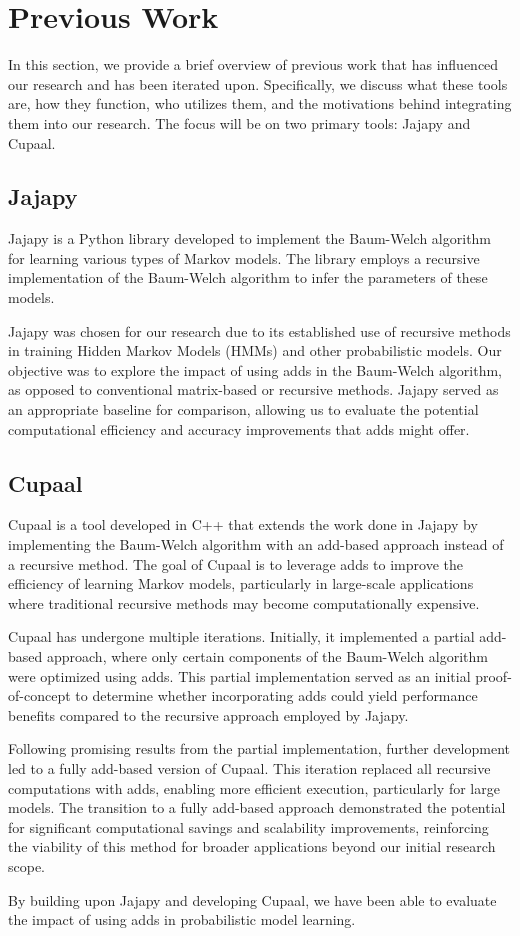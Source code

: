 \section{Previous Work}\label{sec:jajapy_and_cupaal}
In this section, we provide a brief overview of previous work that has influenced our research and has been iterated upon.
Specifically, we discuss what these tools are, how they function, who utilizes them, and the motivations behind integrating them into our research.
The focus will be on two primary tools: Jajapy and Cupaal.


\subsection{Jajapy}\label{subsec:jajapy}
Jajapy is a Python library developed to implement the Baum-Welch algorithm for learning various types of Markov models.
The library employs a recursive implementation of the Baum-Welch algorithm to infer the parameters of these models.

Jajapy was chosen for our research due to its established use of recursive methods in training Hidden Markov Models (HMMs) and other probabilistic models.
Our objective was to explore the impact of using \glspl{add} in the Baum-Welch algorithm, as opposed to conventional matrix-based or recursive methods.
Jajapy served as an appropriate baseline for comparison, allowing us to evaluate the potential computational efficiency and accuracy improvements that \glspl{add} might offer.


\subsection{Cupaal}\label{subsec:cupaal}
Cupaal is a tool developed in C++ that extends the work done in Jajapy by implementing the Baum-Welch algorithm with an \gls{add}-based approach instead of a recursive method.
The goal of Cupaal is to leverage \glspl{add} to improve the efficiency of learning Markov models, particularly in large-scale applications where traditional recursive methods may become computationally expensive.

Cupaal has undergone multiple iterations. Initially, it implemented a partial \gls{add}-based approach, where only certain components of the Baum-Welch algorithm were optimized using \glspl{add}.
This partial implementation served as an initial proof-of-concept to determine whether incorporating \glspl{add} could yield performance benefits compared to the recursive approach employed by Jajapy.

Following promising results from the partial implementation, further development led to a fully \gls{add}-based version of Cupaal.
This iteration replaced all recursive computations with \glspl{add}, enabling more efficient execution, particularly for large models.
The transition to a fully \gls{add}-based approach demonstrated the potential for significant computational savings and scalability improvements, reinforcing the viability of this method for broader applications beyond our initial research scope.

By building upon Jajapy and developing Cupaal, we have been able to evaluate the impact of using \glspl{add} in probabilistic model learning.
